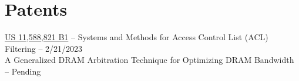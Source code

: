\documentclass[10pt]{deedy-resume-reversed}
\begin{document}
\begin{minipage}[t]{1.0\textwidth}

\section{Patents}
\href{https://image-ppubs.uspto.gov/dirsearch-public/print/downloadPdf/11588821}{US 11,588,821 B1} 
– Systems and Methods for Access Control List (ACL) Filtering – 2/21/2023 \\
A Generalized DRAM Arbitration Technique for Optimizing DRAM Bandwidth – Pending
\sectionsep

\end{minipage}
\end{document}
